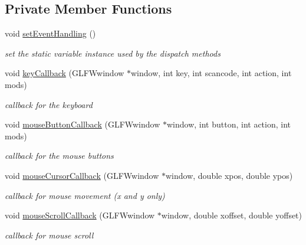 \subsection*{Private Member Functions}
\begin{DoxyCompactItemize}
\item 
\mbox{\label{class_input_system_a7bcc073212eb102a79d0ec81017662c1}} 
void \mbox{\hyperlink{class_input_system_a7bcc073212eb102a79d0ec81017662c1}{set\+Event\+Handling}} ()
\begin{DoxyCompactList}\small\item\em set the static variable instance used by the dispatch methods \end{DoxyCompactList}\item 
void \mbox{\hyperlink{class_input_system_a5d560cf5c979be4ef7ddd176e5adfda2}{key\+Callback}} (G\+L\+F\+Wwindow $\ast$window, int key, int scancode, int action, int mods)
\begin{DoxyCompactList}\small\item\em callback for the keyboard \end{DoxyCompactList}\item 
void \mbox{\hyperlink{class_input_system_a99b450620611f7848abe17168a07b903}{mouse\+Button\+Callback}} (G\+L\+F\+Wwindow $\ast$window, int button, int action, int mods)
\begin{DoxyCompactList}\small\item\em callback for the mouse buttons \end{DoxyCompactList}\item 
void \mbox{\hyperlink{class_input_system_a9a96ec09226bd475878d3d9e2667bb3b}{mouse\+Cursor\+Callback}} (G\+L\+F\+Wwindow $\ast$window, double xpos, double ypos)
\begin{DoxyCompactList}\small\item\em callback for mouse movement (x and y only) \end{DoxyCompactList}\item 
void \mbox{\hyperlink{class_input_system_adff4716530b70b0378f03c3c28b76599}{mouse\+Scroll\+Callback}} (G\+L\+F\+Wwindow $\ast$window, double xoffset, double yoffset)
\begin{DoxyCompactList}\small\item\em callback for mouse scroll \end{DoxyCompactList}\end{DoxyCompactItemize}
